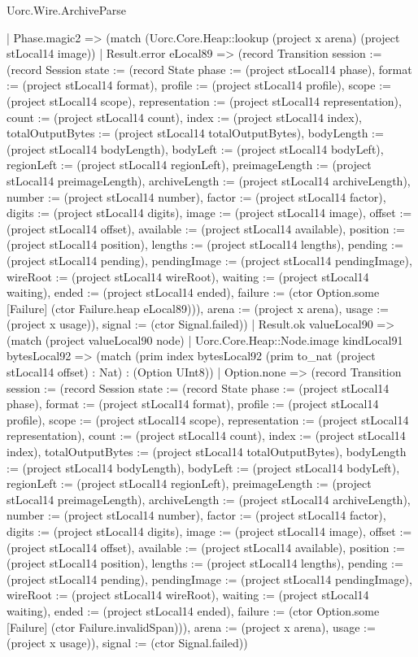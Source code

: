 \begin{lexlean}{Uorc.Wire.ArchiveParse}
\begin{semanticmodule}
{        | Phase.magic2 => (match (Uorc.Core.Heap::lookup (project x arena) (project stLocal14 image))
          | Result.error eLocal89 => (record Transition {session := (record Session {state := (record State {phase := (project stLocal14 phase), format := (project stLocal14 format), profile := (project stLocal14 profile), scope := (project stLocal14 scope), representation := (project stLocal14 representation), count := (project stLocal14 count), index := (project stLocal14 index), totalOutputBytes := (project stLocal14 totalOutputBytes), bodyLength := (project stLocal14 bodyLength), bodyLeft := (project stLocal14 bodyLeft), regionLeft := (project stLocal14 regionLeft), preimageLength := (project stLocal14 preimageLength), archiveLength := (project stLocal14 archiveLength), number := (project stLocal14 number), factor := (project stLocal14 factor), digits := (project stLocal14 digits), image := (project stLocal14 image), offset := (project stLocal14 offset), available := (project stLocal14 available), position := (project stLocal14 position), lengths := (project stLocal14 lengths), pending := (project stLocal14 pending), pendingImage := (project stLocal14 pendingImage), wireRoot := (project stLocal14 wireRoot), waiting := (project stLocal14 waiting), ended := (project stLocal14 ended), failure := (ctor Option.some [Failure] (ctor Failure.heap eLocal89))}), arena := (project x arena), usage := (project x usage)}), signal := (ctor Signal.failed)})
          | Result.ok valueLocal90 => (match (project valueLocal90 node)
            | Uorc.Core.Heap::Node.image kindLocal91 bytesLocal92 => (match (prim index bytesLocal92 (prim to_nat (project stLocal14 offset) : Nat) : (Option UInt8))
              | Option.none => (record Transition {session := (record Session {state := (record State {phase := (project stLocal14 phase), format := (project stLocal14 format), profile := (project stLocal14 profile), scope := (project stLocal14 scope), representation := (project stLocal14 representation), count := (project stLocal14 count), index := (project stLocal14 index), totalOutputBytes := (project stLocal14 totalOutputBytes), bodyLength := (project stLocal14 bodyLength), bodyLeft := (project stLocal14 bodyLeft), regionLeft := (project stLocal14 regionLeft), preimageLength := (project stLocal14 preimageLength), archiveLength := (project stLocal14 archiveLength), number := (project stLocal14 number), factor := (project stLocal14 factor), digits := (project stLocal14 digits), image := (project stLocal14 image), offset := (project stLocal14 offset), available := (project stLocal14 available), position := (project stLocal14 position), lengths := (project stLocal14 lengths), pending := (project stLocal14 pending), pendingImage := (project stLocal14 pendingImage), wireRoot := (project stLocal14 wireRoot), waiting := (project stLocal14 waiting), ended := (project stLocal14 ended), failure := (ctor Option.some [Failure] (ctor Failure.invalidSpan))}), arena := (project x arena), usage := (project x usage)}), signal := (ctor Signal.failed)})
}
\end{semanticmodule}
\end{lexlean}
